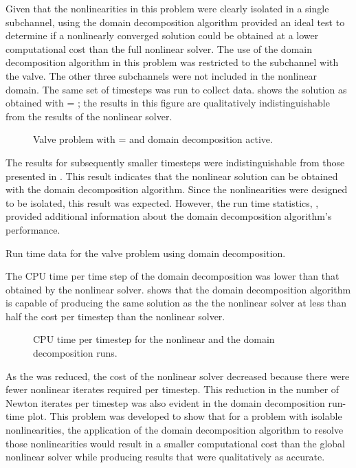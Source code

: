 Given that the nonlinearities in this problem were clearly isolated in a single subchannel, using the domain decomposition algorithm provided an ideal test to determine if a nonlinearly converged solution could be obtained at a lower computational cost than the full nonlinear solver.
The use of the domain decomposition algorithm in this problem was restricted to the subchannel with the valve.
The other three subchannels were not included in the nonlinear domain.
The same set of timesteps was run to collect data.
 shows the solution as obtained with \dtmax{} = ; the results in this figure are qualitatively indistinguishable from the results of the nonlinear solver.

\begin{figure}[h!tb]
\centering

\caption{Valve problem with \dtmax{} =  and domain decomposition active.}
\label{fig:valveDom6pt25em02}
\end{figure}

The results for subsequently smaller timesteps were indistinguishable from those presented in .
This result indicates that the nonlinear solution can be obtained with the domain decomposition algorithm.
Since the nonlinearities were designed to be isolated, this result was expected.
However, the run time statistics, , provided additional information about the domain decomposition algorithm's performance.

\begin{table}[h!tb]
\centering
\singlespace

\caption{Run time data for the valve problem using domain decomposition.}
\label{tab:valveDomTable}
\end{table}

The CPU time per time step of the domain decomposition was lower than that obtained by the nonlinear solver.
 shows that the domain decomposition algorithm is capable of producing the same solution as the the nonlinear solver at less than half the cost per timestep than the nonlinear solver.

\begin{figure}[h!tb]
\centering

\caption{CPU time per timestep for the nonlinear and the domain decomposition runs.}
\label{fig:valveRunTime}
\end{figure}

As the \dtmax{} was reduced, the cost of the nonlinear solver decreased because there were fewer nonlinear iterates required per timestep.
This reduction in the number of Newton iterates per timestep was also evident in the domain decomposition run-time plot.
This problem was developed to show that for a problem with isolable nonlinearities, the application of the domain decomposition algorithm to resolve those nonlinearities would result in a smaller computational cost than the global nonlinear solver while producing results that were qualitatively as accurate.

